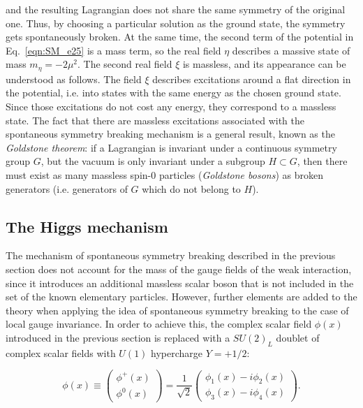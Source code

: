 \noindent and the resulting Lagrangian does not share the same symmetry of the original one. Thus, by choosing a particular solution as the ground state, the symmetry gets spontaneously broken.
At the same time, the second term of the potential in Eq.~\ref{eqn:SM_e25} is a mass term, so the real field $\eta$ describes a massive state of mass $m_\eta = -2\mu^2$.
The second real field $\xi$ is massless, and its appearance can be understood as follows.
The field $\xi$ describes excitations around a flat direction in the potential, i.e. into states with the same energy as the chosen ground state.
Since those excitations do not cost any energy, they correspond to a massless state.
The fact that there are massless excitations associated with the spontaneous symmetry breaking mechanism is a general result, known as the \textit{Goldstone theorem}:
if a Lagrangian is invariant under a continuous symmetry group $G$, but the vacuum is only invariant under a subgroup $H \subset G$,
then there must exist as many massless spin-0 particles (\textit{Goldstone bosons}) as broken generators (i.e. generators of $G$ which do not belong to $H$).\\

\subsection{The Higgs mechanism}\label{subsec:HiggsMech}

The mechanism of spontaneous symmetry breaking described in the previous section does not account for the mass of the gauge fields of the weak interaction,
since it introduces an additional massless scalar boson that is not included in the set of the known elementary particles.
However, further elements are added to the theory  when applying the idea of spontaneous symmetry breaking to the case of local gauge invariance.
In order to achieve this, the complex scalar field $\phi(x)$ introduced in the previous section is replaced with a $SU(2)_L$ doublet of complex scalar fields with $U(1)$ hypercharge $Y = +1/2$:

\begin{equation}\label{eqn:SM_e26}
\phi(x) \equiv
\begin{pmatrix}
  \phi^+(x) \\ \phi^0(x)
\end{pmatrix}
= \frac{1}{\sqrt{2}}
\begin{pmatrix}
  \phi_1(x) - i\phi_2(x) \\ \phi_3(x) - i\phi_4(x)
\end{pmatrix}.
\end{equation}

